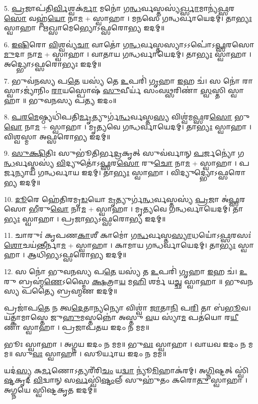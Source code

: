 5. \ul{𑌪𑍍𑌰}𑌜𑌾𑌪॑𑌤𑌿\ul{𑌰𑍍𑌵𑌿}𑌶𑍍𑌵𑌕॑\ul{𑌰𑍍𑌮𑌾} 𑌮𑌨𑍋॑ 𑌗\ul{𑌨𑍍𑌧}𑌰𑍍𑌵𑌸𑍍𑌤𑌸𑍍𑌯॑\ul{𑌰𑍍𑌖𑍍𑌸𑌾}𑌮𑌾𑌨𑍍𑌯॑\ul{𑌫𑍍𑌸}𑌰\ul{𑌸𑍋} 𑌵𑌹𑍍𑌨॑\ul{𑌯𑍋} 𑌨𑌾\ul{𑌮} + 𑌸𑍍𑌵𑌾𑌹𑌾।
𑌮𑌨𑌸𑍇 𑌗𑌨𑍍𑌧𑌰𑍍𑌵𑌾𑌯𑍇𑌦𑌮𑍍। 𑌤𑌾\ul{𑌭𑍍𑌯𑌃} 𑌸𑍍𑌵𑌾𑌹𑌾। 𑌋𑌖𑍍𑌸𑌾𑌮𑍇𑌭𑍍𑌯𑍋𑌽𑌫𑍍𑌸𑌰𑍋𑌭𑍍𑌯 𑌇𑌦𑌮𑍍॥

6. \ul{𑌇}\ul{𑌷𑌿}𑌰𑍋 \ul{𑌵𑌿}𑌶𑍍𑌵𑌵𑍍𑌯॑\ul{𑌚𑌾} 𑌵𑌾𑌤𑍋॑ 𑌗\ul{𑌨𑍍𑌧}𑌰𑍍𑌵𑌸𑍍𑌤𑌸𑍍𑌯𑌾𑌽𑌽𑌪𑍋॑॑𑌽\ul{𑌫𑍍𑌸}𑌰𑌸𑍋 \ul{𑌮𑍁}𑌦𑌾 𑌨𑌾\ul{𑌮} + 𑌸𑍍𑌵𑌾𑌹𑌾।
𑌵𑌾𑌤𑌾𑌯 𑌗𑌨𑍍𑌧𑌰𑍍𑌵𑌾𑌯𑍇𑌦𑌮𑍍। 𑌤𑌾\ul{𑌭𑍍𑌯𑌃} 𑌸𑍍𑌵𑌾𑌹𑌾। 𑌅𑌦𑍍𑌭𑍍𑌯𑍋𑌽𑌫𑍍𑌸𑌰𑍋𑌭𑍍𑌯𑌃 𑌇𑌦𑌮𑍍॥

7. 𑌭𑍁𑌵॑𑌨𑌸𑍍𑌯 𑌪\ul{𑌤𑍇} 𑌯𑌸𑍍𑌯॑ 𑌤𑍇 \ul{𑌉}𑌪𑌰𑌿॑ \ul{𑌗𑍃}𑌹𑌾 \ul{𑌇}𑌹 𑌚॑।
𑌸 𑌨𑍋॑ 𑌰𑌾𑌸𑍍𑌵𑌾𑌽𑌜𑍍𑌯𑌾॑𑌨𑌿𑌂 \ul{𑌰𑌾}𑌯𑌸𑍍𑌪𑍋𑌷॑ \ul{𑌸𑍁}𑌵𑍀𑌰𑍍𑌯॑ 𑌸𑌂𑌵\ul{𑌥𑍍𑌸}𑌰𑌿𑌣𑌾॑ \ul{𑌸𑍍𑌵}𑌸𑍍𑌤𑌿 𑌸𑍍𑌵𑌾𑌹𑌾॥ 𑌭𑍁𑌵𑌨𑌸𑍍𑌯 𑌪𑌤𑍍𑌯 𑌇𑌦𑌂॥

8. \ul{𑌪}\ul{𑌰}\ul{𑌮𑍇}𑌷𑍍𑌠𑍍𑌯𑌧𑌿॑𑌪𑌤𑌿\ul{𑌰𑍍𑌮𑍃}𑌤𑍍𑌯𑍁𑌰𑍍𑌗॑\ul{𑌨𑍍𑌧}𑌰𑍍𑌵𑌸𑍍𑌤\ul{𑌸𑍍𑌯} 𑌵𑌿𑌶𑍍𑌵॑𑌮\ul{𑌫𑍍𑌸}𑌰\ul{𑌸𑍋} 𑌭𑍁\ul{𑌵𑍋} 𑌨𑌾\ul{𑌮} + 𑌸𑍍𑌵𑌾𑌹𑌾।
𑌮𑍃𑌤𑍍𑌯𑌵𑍇 𑌗𑌨𑍍𑌧𑌰𑍍𑌵𑌾𑌯𑍇𑌦𑌮𑍍। 𑌤𑌾\ul{𑌭𑍍𑌯𑌃} 𑌸𑍍𑌵𑌾𑌹𑌾। 𑌵𑌿𑌶𑍍𑌵𑌸𑍍𑌮𑌾 𑌅𑌫𑍍𑌸𑌰𑍋𑌭𑍍𑌯 𑌇𑌦𑌮𑍍॥

9. \ul{𑌸𑍁}\ul{𑌕𑍍𑌷𑌿}𑌤𑌿𑌃 𑌸𑍁𑌭𑍂॑𑌤𑌿𑌰𑍍𑌭\ul{𑌦𑍍𑌰}𑌕𑍃𑌤𑍍 𑌸𑍁𑌵॑𑌰𑍍𑌵𑌾𑌨𑍍 \ul{𑌪}𑌰𑍍𑌜𑌨𑍍𑌯𑍋॑ 𑌗\ul{𑌨𑍍𑌧}𑌰𑍍𑌵𑌸𑍍𑌤𑌸𑍍𑌯॑ \ul{𑌵𑌿}𑌦𑍍𑌯𑍁𑌤𑍋॑॑𑌽\ul{𑌫𑍍𑌸}𑌰\ul{𑌸𑍋} 𑌰𑍁\ul{𑌚𑍋} 𑌨𑌾\ul{𑌮} + 𑌸𑍍𑌵𑌾𑌹𑌾। 𑌪𑌰𑍍𑌜𑌨𑍍𑌯𑌾𑌯 𑌗𑌨𑍍𑌧𑌰𑍍𑌵𑌾𑌯 𑌇𑌦𑌮𑍍। 𑌤𑌾\ul{𑌭𑍍𑌯𑌃} 𑌸𑍍𑌵𑌾𑌹𑌾। 𑌵𑌿𑌦𑍍𑌯𑍁𑌦𑍍𑌭𑍍𑌯𑍋𑌽𑌫𑍍𑌸𑌰𑍋𑌭𑍍𑌯 𑌇𑌦𑌮𑍍॥

10. \ul{𑌦𑍂}𑌰𑍇 𑌹𑍇॑𑌤𑌿𑌰𑌮𑍃\ul{𑌡}𑌯𑍋 \ul{𑌮𑍃}𑌤𑍍𑌯𑍁𑌰𑍍𑌗॑\ul{𑌨𑍍𑌧}𑌰𑍍𑌵𑌸𑍍𑌤𑌸𑍍𑌯॑ \ul{𑌪𑍍𑌰}𑌜𑌾 𑌅॑\ul{𑌫𑍍𑌸}𑌰𑌸𑍋 \ul{𑌭𑍀}𑌰𑍁\ul{𑌵𑍋} 𑌨𑌾\ul{𑌮} + 𑌸𑍍𑌵𑌾𑌹𑌾।
𑌮𑍃𑌤𑍍𑌯𑌵𑍇 𑌗𑌨𑍍𑌧𑌰𑍍𑌵𑌾𑌯𑍇𑌦𑌮𑍍। 𑌤𑌾\ul{𑌭𑍍𑌯𑌃} 𑌸𑍍𑌵𑌾𑌹𑌾। 𑌪𑍍𑌰𑌜𑌾𑌭𑍍𑌯𑌽𑌫𑍍𑌸𑌰𑍋𑌭𑍍𑌯 𑌇𑌦𑌮𑍍॥

11. 𑌚𑌾𑌰𑍁𑌃॑ 𑌕𑍃𑌪𑌣\ul{𑌕𑌾}𑌶𑍀 𑌕𑌾𑌮𑍋॑ 𑌗\ul{𑌨𑍍𑌧}𑌰𑍍𑌵𑌸𑍍𑌤\ul{𑌸𑍍𑌯𑌾}𑌧𑌯𑍋॑॑𑌽\ul{𑌫𑍍𑌸}𑌰𑌸𑌃॑ \ul{𑌶𑍋}𑌚𑌯॑\ul{𑌨𑍍𑌤𑍀}𑌰𑍍𑌨𑌾\ul{𑌮} + 𑌸𑍍𑌵𑌾𑌹𑌾।
𑌕𑌾𑌮𑌾𑌯 𑌗𑌨𑍍𑌧𑌰𑍍𑌵𑌾𑌯𑍇𑌦𑌮𑍍। 𑌤𑌾\ul{𑌭𑍍𑌯𑌃} 𑌸𑍍𑌵𑌾𑌹𑌾। 𑌆𑌧𑌿𑌭𑍍𑌯𑌽𑌫𑍍𑌸𑌰𑍋𑌭𑍍𑌯 𑌇𑌦𑌮𑍍॥

12. 𑌸 𑌨𑍋॑ 𑌭𑍁𑌵𑌨𑌸𑍍𑌯 𑌪\ul{𑌤𑍇} 𑌯𑌸𑍍𑌯॑ 𑌤 \ul{𑌉}𑌪𑌰𑌿॑ \ul{𑌗𑍃}𑌹𑌾 \ul{𑌇}𑌹 𑌚॑।
\ul{𑌉}𑌰𑍁 𑌬𑍍𑌰𑌹𑍍𑌮॑\ul{𑌣𑍇}𑌽𑌸𑍍𑌮𑍈 \ul{𑌕𑍍𑌷}𑌤𑍍𑌰𑌾\ul{𑌯} 𑌮\ul{𑌹𑌿} 𑌶𑌰𑍍𑌮॑ 𑌯\ul{𑌚𑍍𑌛} 𑌸𑍍𑌵𑌾𑌹𑌾॥ 𑌭𑍁𑌵𑌨𑌸𑍍𑌯 𑌪𑌤𑍍𑌯𑍈 𑌬𑍍𑌰𑌹𑍍𑌮𑌣 𑌇𑌦𑌮𑍍॥

𑌪𑍍𑌰𑌜𑌾॑𑌪\ul{𑌤𑍇} 𑌨 𑌤𑍍𑌵\ul{𑌦𑍇}𑌤𑌾\ul{𑌨𑍍𑌯}𑌨𑍍𑌯𑍋 𑌵𑌿𑌶𑍍𑌵𑌾॑ \ul{𑌜𑌾}𑌤𑌾\ul{𑌨𑌿} 𑌪\ul{𑌰𑌿} 𑌤𑌾 𑌬॑\ul{𑌭𑍂}𑌵।
𑌯𑌤𑍍𑌕𑌾॑𑌮𑌾𑌸𑍍𑌤𑍇 𑌜𑍁\ul{𑌹𑍁}𑌮𑌸𑍍𑌤𑌨𑍍𑌨𑍋॑ 𑌅𑌸𑍍𑌤𑍁 \ul{𑌵}𑌯 𑌸𑍍𑌯𑌾॑\ul{𑌮} 𑌪𑌤॑𑌯𑍋 𑌰\ul{𑌯𑍀}𑌣𑌾 𑌸𑍍𑌵𑌾𑌹𑌾। 𑌪𑍍𑌰𑌜𑌾𑌪𑌤𑌯 𑌇𑌦𑌂 𑌨 𑌮𑌮॥

𑌭𑍂𑌃 𑌸𑍍𑌵𑌾𑌹𑌾। 𑌅𑌗𑍍𑌨𑌯 𑌇𑌦𑌂 𑌨 𑌮𑌮॥
𑌭𑍁\ul{𑌵𑌃} 𑌸𑍍𑌵𑌾𑌹𑌾। 𑌵𑌾𑌯𑌵 𑌇𑌦𑌂 𑌨 𑌮𑌮॥
𑌸𑍁\ul{𑌵𑌃} 𑌸𑍍𑌵𑌾𑌹𑌾। 𑌸𑍂𑌰𑍍𑌯𑌾𑌯 𑌇𑌦𑌂 𑌨 𑌮𑌮॥   

𑌯𑌦॑\ul{𑌸𑍍𑌯} 𑌕\ul{𑌰𑍍𑌮}𑌣𑍋𑌽𑌤𑍍𑌯𑌰𑍀॑𑌰𑌿\ul{𑌚𑌂} 𑌯\ul{𑌦𑍍𑌵𑌾} 𑌨𑍍𑌯𑍂॑\ul{𑌮𑌿}𑌹𑌾𑌕॑𑌰𑌮𑍍। 𑌅\ul{𑌗𑍍𑌨𑌿}𑌷𑍍𑌟𑌤𑍍 𑌸𑍍𑌵𑌿॑\ul{𑌷𑍍𑌟}𑌕𑍃𑌦𑍍 \ul{𑌵𑌿}𑌦𑍍𑌵𑌾𑌨𑍍 𑌸\ul{𑌰𑍍𑌵}𑌸𑍍𑌵𑌿॑\ul{𑌷𑍍𑌟𑌂}𑌲𑍍 𑌸𑍁𑌹𑍁॑𑌤𑌂 𑌕𑌰𑍋\ul{𑌤𑍁} 𑌸𑍍𑌵𑌾𑌹𑌾। 𑌅𑌗𑍍𑌨𑌯𑍇 𑌸𑍍𑌵𑌿𑌷𑍍𑌟𑌕𑍃𑌤 𑌇𑌦𑌮𑍍॥
